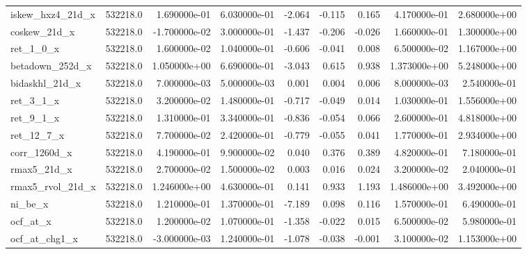 \documentclass[12pt]{article}
\begin{document}
\begin{landscape}
\begin{longtable}{|l|r|r|r|r|r|r|r|r|}
iskew\_hxz4\_21d\_x       &  532218.0 &  1.690000e-01 &  6.030000e-01 &      -2.064 &       -0.115 &        0.165 &  4.170000e-01 &  2.680000e+00 \\
coskew\_21d\_x           &  532218.0 & -1.700000e-02 &  3.000000e-01 &      -1.437 &       -0.206 &       -0.026 &  1.660000e-01 &  1.300000e+00 \\
ret\_1\_0\_x              &  532218.0 &  1.600000e-02 &  1.040000e-01 &      -0.606 &       -0.041 &        0.008 &  6.500000e-02 &  1.167000e+00 \\
betadown\_252d\_x        &  532218.0 &  1.050000e+00 &  6.690000e-01 &      -3.043 &        0.615 &        0.938 &  1.373000e+00 &  5.248000e+00 \\
bidaskhl\_21d\_x         &  532218.0 &  7.000000e-03 &  5.000000e-03 &       0.001 &        0.004 &        0.006 &  8.000000e-03 &  2.540000e-01 \\
ret\_3\_1\_x              &  532218.0 &  3.200000e-02 &  1.480000e-01 &      -0.717 &       -0.049 &        0.014 &  1.030000e-01 &  1.556000e+00 \\
ret\_9\_1\_x              &  532218.0 &  1.310000e-01 &  3.340000e-01 &      -0.836 &       -0.054 &        0.066 &  2.600000e-01 &  4.818000e+00 \\
ret\_12\_7\_x             &  532218.0 &  7.700000e-02 &  2.420000e-01 &      -0.779 &       -0.055 &        0.041 &  1.770000e-01 &  2.934000e+00 \\
corr\_1260d\_x           &  532218.0 &  4.190000e-01 &  9.900000e-02 &       0.040 &        0.376 &        0.389 &  4.820000e-01 &  7.180000e-01 \\
rmax5\_21d\_x            &  532218.0 &  2.700000e-02 &  1.500000e-02 &       0.003 &        0.016 &        0.024 &  3.200000e-02 &  2.040000e-01 \\
rmax5\_rvol\_21d\_x       &  532218.0 &  1.246000e+00 &  4.630000e-01 &       0.141 &        0.933 &        1.193 &  1.486000e+00 &  3.492000e+00 \\
ni\_be\_x                &  532218.0 &  1.210000e-01 &  1.370000e-01 &      -7.189 &        0.098 &        0.116 &  1.570000e-01 &  6.490000e-01 \\
ocf\_at\_x               &  532218.0 &  1.200000e-02 &  1.070000e-01 &      -1.358 &       -0.022 &        0.015 &  6.500000e-02 &  5.980000e-01 \\
ocf\_at\_chg1\_x          &  532218.0 & -3.000000e-03 &  1.240000e-01 &      -1.078 &       -0.038 &       -0.001 &  3.100000e-02 &  1.153000e+00 \\

\end{longtable}
\end{landscape}
\end{document}

